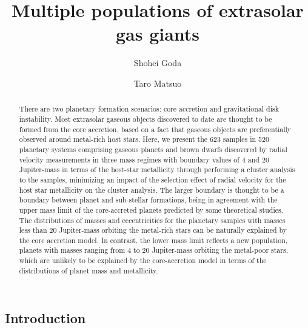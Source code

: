 \documentclass[twocolumn, dvipdfmx]{aastex62}
\begin{document}
\begin{CJK*}{UTF8}{min}

\title{Multiple populations of extrasolar gas giants}

\author{Shohei Goda}

\author{Taro Matsuo}


\begin{abstract}

There are two planetary formation scenarios: core accretion and gravitational disk instability. Most extrasolar gaseous objects discovered to date are thought to be formed from the core accretion, based on a fact that gaseous objects are preferentially observed around metal-rich host stars. Here, we present the 623 samples in 520 planetary systems comprising gaseous planets and brown dwarfs discovered by radial velocity measurements in three mass regimes with boundary values of 4 and 20 Jupiter-mass in terms of the host-star metallicity through performing a cluster analysis to the samples, minimizing an impact of the selection effect of radial velocity for the host star metallicity on the cluster analysis. The larger boundary is thought to be a boundary between planet and sub-stellar formations, being in agreement with the upper mass limit of the core-accreted planets predicted by some theoretical studies. The distributions of masses and eccentricities for the planetary samples with masses less than 20 Jupiter-mass orbiting the metal-rich stars can be naturally explained by the core accretion model. In contrast, the lower mass limit reflects a new population, planets with masses ranging from 4 to 20 Jupiter-mass orbiting the metal-poor stars, which are unlikely to be explained by the core-accretion model in terms of the distributions of planet mass and metallicity.


\end{abstract}

\vspace{1cm}



\section{Introduction} \label{sec:introduction}


\end{CJK*}
\end{document}
